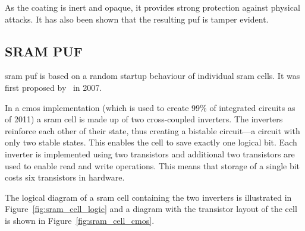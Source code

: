 As the coating is inert and opaque, it provides strong protection against physical attacks. It has also been shown that the resulting \gls{puf} is tamper evident.\cite{Tuyls2006}


\subsection{SRAM PUF}

\gls{sram} \gls{puf} is based on a random startup behaviour of individual \gls{sram} cells. It was first proposed by~\cite{Guajardo2007} in 2007.

In a \gls{cmos} implementation (which is used to create 99\% of integrated circuits as of 2011\cite{Voinigescu2013}) a \gls{sram} cell is made up of two cross-coupled inverters. The inverters reinforce each other of their state, thus creating a bistable circuit---a circuit with only two stable states. This enables the cell to save exactly one logical bit. Each inverter is implemented using two transistors and additional two transistors are used to enable read and write operations. This means that storage of a single bit costs six transistors in hardware.\cite{Maes2010}

The logical diagram of a \gls{sram} cell containing the two inverters is illustrated in Figure~\ref{fig:sram_cell_logic} and a diagram with the transistor layout of the cell is shown in Figure~\ref{fig:sram_cell_cmos}.

